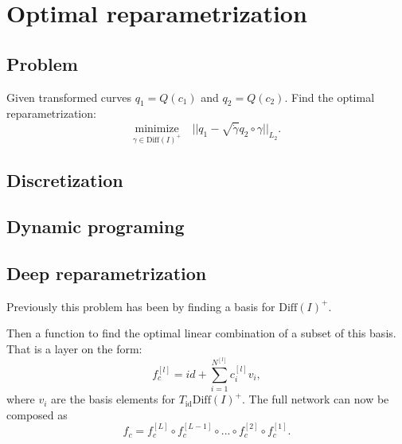 
\section{Optimal reparametrization}
\subsection{Problem }
Given transformed curves $q_1= Q(c_1)$ and $q_2 = Q(c_2)$. Find the optimal reparametrization: 
\begin{equation}
  \underset{\gamma \in \text{Diff}(I)^+}{\text{minimize}} \quad || q_1- \sqrt{\dot\gamma}q_2 \circ \gamma||_{L_2}.
\end{equation}
\subsection{Discretization}

\subsection{Dynamic programing}
\subsection{Deep reparametrization}
Previously this problem has been by finding a basis for $\text{Diff}(I)^+ $. 

Then a function to find the optimal linear combination of a subset of this basis. That is a layer on the form:
\begin{equation}
  f_{c}^{[l]}= id +  \sum_{i=1}^{N^{[l]}} c_i^{[l]} v_i, 
\end{equation}
where $v_i$ are the basis elements for $T_{\text{id}}\text{Diff}(I)^+ $.
The full network can now be composed as 
\begin{equation}
  f_{c} = f_{c}^{[L]} \circ f_{c}^{[L-1]} \circ ... \circ f_{c}^{[2]} \circ f_{c}^{[1]}.
\end{equation}